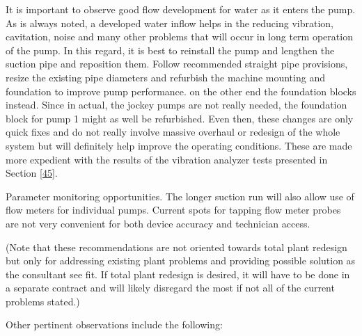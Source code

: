It is important to observe good flow development for water as it enters the pump. As is always noted, a developed water inflow helps in the reducing vibration, cavitation, noise and many other problems that will occur in long term operation of the pump. In this regard, it is best to reinstall the pump and lengthen the suction pipe and reposition them. Follow recommended straight pipe provisions, resize the existing pipe diameters and refurbish the machine mounting and foundation to improve pump performance. on the other end the foundation blocks instead. Since in actual, the jockey pumps are not really needed, the foundation block for pump 1 might as well be refurbished. Even then, these changes are only quick fixes and do not really involve massive overhaul or redesign of the whole system but will definitely help improve the operating conditions. These are made more expedient with the results of the vibration analyzer tests presented in Section \ref{45}.





Parameter monitoring opportunities. The longer suction run will also allow use of flow meters for individual pumps. Current spots for tapping flow meter probes are not very convenient for both device accuracy and technician access. 

(Note that these recommendations are not oriented towards total plant redesign but only for addressing existing plant problems and providing possible solution as the consultant see fit. If total plant redesign is desired, it will have to be done in a separate contract and will likely disregard the most if not all of the current problems stated.)

Other pertinent observations include the following:

